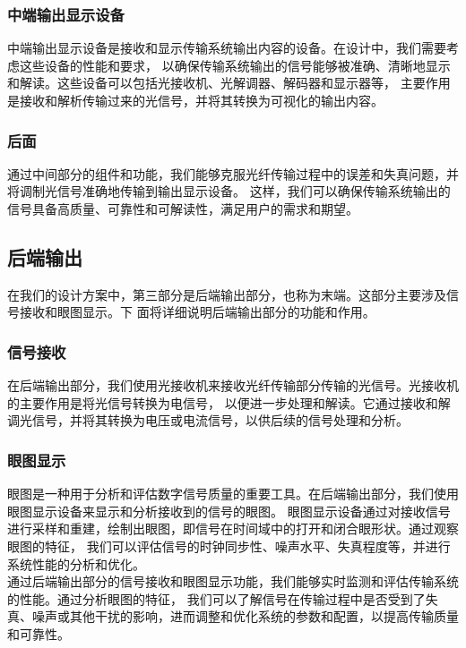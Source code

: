 \documentclass[12pt]{article}
\begin{document}
\subsubsection*{中端输出显示设备}
中端输出显示设备是接收和显示传输系统输出内容的设备。在设计中，我们需要考虑这些设备的性能和要求，
以确保传输系统输出的信号能够被准确、清晰地显示和解读。这些设备可以包括光接收机、光解调器、解码器和显示器等，
主要作用是接收和解析传输过来的光信号，并将其转换为可视化的输出内容。
\subsubsection*{后面}
通过中间部分的组件和功能，我们能够克服光纤传输过程中的误差和失真问题，并将调制光信号准确地传输到输出显示设备。
这样，我们可以确保传输系统输出的信号具备高质量、可靠性和可解读性，满足用户的需求和期望。
\subsection{后端输出}
在我们的设计方案中，第三部分是后端输出部分，也称为末端。这部分主要涉及信号接收和眼图显示。下
面将详细说明后端输出部分的功能和作用。
\subsubsection*{信号接收}
在后端输出部分，我们使用光接收机来接收光纤传输部分传输的光信号。光接收机的主要作用是将光信号转换为电信号，
以便进一步处理和解读。它通过接收和解调光信号，并将其转换为电压或电流信号，以供后续的信号处理和分析。
\subsubsection*{眼图显示}
眼图是一种用于分析和评估数字信号质量的重要工具。在后端输出部分，我们使用眼图显示设备来显示和分析接收到的信号的眼图。
眼图显示设备通过对接收信号进行采样和重建，绘制出眼图，即信号在时间域中的打开和闭合眼形状。通过观察眼图的特征，
我们可以评估信号的时钟同步性、噪声水平、失真程度等，并进行系统性能的分析和优化。
\\
通过后端输出部分的信号接收和眼图显示功能，我们能够实时监测和评估传输系统的性能。通过分析眼图的特征，
我们可以了解信号在传输过程中是否受到了失真、噪声或其他干扰的影响，进而调整和优化系统的参数和配置，以提高传输质量和可靠性。
\\
\end{document}
